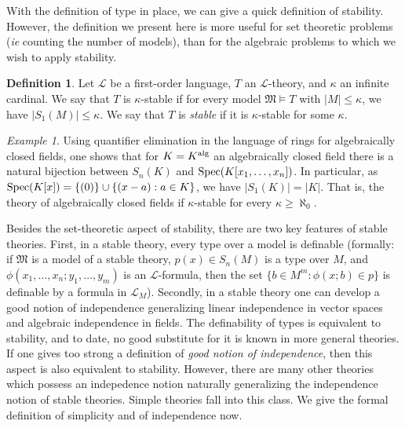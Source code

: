 \documentclass{amsart}
\newcommand{\cL}{{\mathcal L}}
\newcommand{\fM}{{\mathfrak M}}
\newcommand{\alg}{{\rm alg}}
\theoremstyle{definition}
\newtheorem{Def}[thm]{Definition}
\theoremstyle{remark}
\newtheorem{Example}[thm]{Example}
\begin{document}
With the definition of type in place, we can give a quick definition of stability.  However, 
the definition we present here is more useful for set theoretic problems (\emph{ie} counting 
the number of models), than for the algebraic problems to which we wish to apply stability.

\begin{Def}
Let $\cL$ be a first-order language, $T$ an $\cL$-theory, and $\kappa$ an infinite cardinal.
We say that $T$ is $\kappa$-stable if for every model $\fM \models T$ with $|M| \leq \kappa$, 
we have $|S_1(M)| \leq \kappa$. We say that $T$ is \emph{stable} if it is $\kappa$-stable
for some $\kappa$.
\end{Def}

\begin{Example}
Using quantifier elimination in the language of rings for 
algebraically closed fields, one shows that for $K = K^\alg$ an algebraically closed
field there is a natural bijection between $S_n(K)$ and ${\rm Spec}(K[x_1, \ldots, x_n])$.  
In particular, as ${\rm Spec}(K[x]) = \{ (0) \} \cup \{ (x - a) : a \in K \}$, we 
have $|S_1(K)| = |K|$.  That is, the theory of algebraically closed fields if $\kappa$-stable
for every $\kappa \geq \aleph_0$.
\end{Example}

Besides the set-theoretic aspect of stability, there are two key features of stable theories.
First, in a stable theory, every type over a model is definable (formally: if $\fM$ is a 
model of a stable theory, $p(x) \in S_n(M)$ is a type over $M$, and $\phi(x_1, \ldots, x_n;y_1, \ldots, y_m)$
 is an $\cL$-formula, then the set $\{ b \in M^m : \phi(x;b) \in p \}$ is definable by a 
formula in $\cL_M$).  Secondly, in a stable theory one can develop a good notion of independence
generalizing linear independence in vector spaces and algebraic independence in fields.   The definability
of types is equivalent to stability, and to date, no good substitute for it is known in 
more general theories.  If one gives 
too strong a definition of \emph{good notion of independence}, then this aspect is also equivalent to 
stability.  However, there are many other theories which possess 
an indepedence notion naturally generalizing the independence notion of stable theories.  Simple 
theories fall into this class.
We give the formal definition of simplicity and of independence now.
\end{document}
